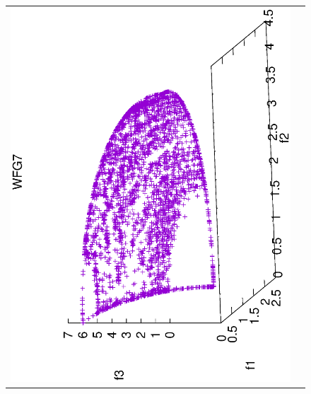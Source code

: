 \begin{figure}[H]
\begin{tabular}{cc}
  \includegraphics[scale=0.3, angle=-90,origin=c]{Figures_Chapter7/Results_Chapter4/Summary_Representative/VSD-MOEA/WFG7.eps} &

\end{tabular}
\end{figure}
